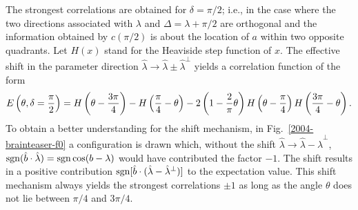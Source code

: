 \documentclass[prl,preprint,amsfonts,showpacs,showkeys]{revtex4}
\begin{document}
The strongest correlations are obtained for $\delta =\pi /2$; i.e., in the case
where the two directions associated with ${ \lambda }$ and ${ \Delta} ={ \lambda }+ \pi /2$
are orthogonal
and the information obtained by $c (\pi /2)$ is about the location of ${ a}$
within two opposite quadrants.
Let $H(x)$ stand for the Heaviside step function of $x$.
The effective shift in the parameter direction
${\hat \lambda }\longrightarrow {\hat \lambda } \pm {\hat \lambda }^\perp$
yields a correlation function of the form
\begin{equation}
E\left(\theta ,\delta = {\pi \over 2}\right)
=
H\left(\theta - {3 \pi\over 4}\right)
 - H\left({\pi \over 4} - \theta \right)  -
  2\left(1 - {2\over \pi}\theta \right)
H\left(\theta - {\pi\over 4}\right) H\left({3 \pi\over 4} - \theta \right)
.
\label{e-2004-brainteaser-2a}
\end{equation}
To obtain a better understanding for the shift mechanism, in
Fig.~\ref{2004-brainteaser-f0} a configuration is drawn which, without the shift
${\hat \lambda } \longrightarrow {\hat \lambda }-{\hat \lambda }^\perp$,
${\rm sgn}({\hat b} \cdot {\hat \lambda })={\rm sgn} \cos({b} - { \lambda })$
would have contributed the factor $-1$.
The shift
results in
a positive contribution ${\rm sgn}[{\hat b} \cdot ({\hat \lambda }-{\hat \lambda }^\perp )]$
to the expectation value.
This shift mechanism always yields the strongest correlations $\pm 1$ as long as
the angle $\theta$ does not lie between $\pi /4$ and $3 \pi /4$.
\end{document}
